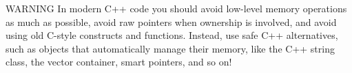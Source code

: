 \begin{myWarning}{WARNING}
In modern C++ code you should avoid low-level memory operations as much as possible, avoid raw pointers when ownership is involved, and avoid using old C-style constructs and functions. Instead, use safe C++ alternatives, such as objects that automatically manage their memory, like the C++ string class, the vector container, smart pointers, and so on!
\end{myWarning}
